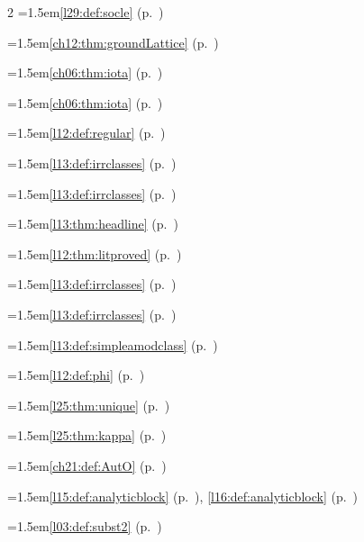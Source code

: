 \begin{multicols}{2}
\hangindent=1.5em\quad \ref{l29:def:socle} (p.~\pageref{l29:def:socle})\par
\hangindent=1.5em\quad \ref{ch12:thm:groundLattice} (p.~\pageref{ch12:thm:groundLattice})\par
\hangindent=1.5em\quad \ref{ch06:thm:iota} (p.~\pageref{ch06:thm:iota})\par
\hangindent=1.5em\quad \ref{ch06:thm:iota} (p.~\pageref{ch06:thm:iota})\par
\hangindent=1.5em\quad \ref{l12:def:regular} (p.~\pageref{l12:def:regular})\par
\hangindent=1.5em\quad \ref{l13:def:irrclasses} (p.~\pageref{l13:def:irrclasses})\par
\hangindent=1.5em\quad \ref{l13:def:irrclasses} (p.~\pageref{l13:def:irrclasses})\par
\hangindent=1.5em\quad \ref{l13:thm:headline} (p.~\pageref{l13:thm:headline})\par
\hangindent=1.5em\quad \ref{l12:thm:litproved} (p.~\pageref{l12:thm:litproved})\par
\hangindent=1.5em\quad \ref{l13:def:irrclasses} (p.~\pageref{l13:def:irrclasses})\par
\hangindent=1.5em\quad \ref{l13:def:irrclasses} (p.~\pageref{l13:def:irrclasses})\par
\hangindent=1.5em\quad \ref{l13:def:simpleamodclass} (p.~\pageref{l13:def:simpleamodclass})\par
\hangindent=1.5em\quad \ref{l12:def:phi} (p.~\pageref{l12:def:phi})\par
\hangindent=1.5em\quad \ref{l25:thm:unique} (p.~\pageref{l25:thm:unique})\par
\hangindent=1.5em\quad \ref{l25:thm:kappa} (p.~\pageref{l25:thm:kappa})\par
\hangindent=1.5em\quad \ref{ch21:def:AutO} (p.~\pageref{ch21:def:AutO})\par
\hangindent=1.5em\quad \ref{l15:def:analyticblock} (p.~\pageref{l15:def:analyticblock}), \ref{l16:def:analyticblock} (p.~\pageref{l16:def:analyticblock})\par
\hangindent=1.5em\quad \ref{l03:def:subst2} (p.~\pageref{l03:def:subst2})\par

\end{multicols}
